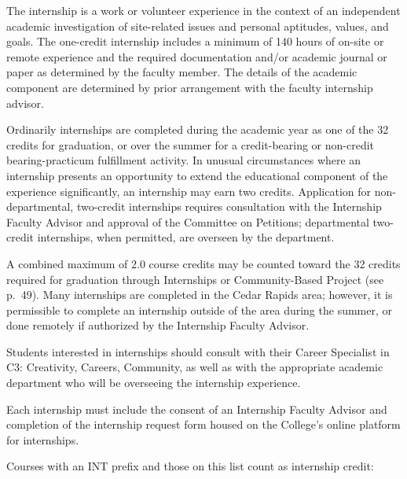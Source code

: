 \documentclass[
  letterpaper,
]{scrbook}
\begin{document}
The internship is a work or volunteer experience in the context of an
independent academic investigation of site-related issues and personal
aptitudes, values, and goals. The one-credit internship includes a
minimum of 140 hours of on-site or remote experience and the required
documentation and/or academic journal or paper as determined by the
faculty member. The details of the academic component are determined by
prior arrangement with the faculty internship advisor.

Ordinarily internships are completed during the academic year as one of
the 32 credits for graduation, or over the summer for a credit-bearing
or non-credit bearing-practicum fulfillment activity. In unusual
circumstances where an internship presents an opportunity to extend the
educational component of the experience significantly, an internship may
earn two credits. Application for non-departmental, two-credit
internships requires consultation with the Internship Faculty Advisor
and approval of the Committee on Petitions; departmental two-credit
internships, when permitted, are overseen by the department.

A combined maximum of 2.0 course credits may be counted toward the 32
credits required for graduation through Internships or Community-Based
Project (see p.~49). Many internships are completed in the Cedar Rapids
area; however, it is permissible to complete an internship outside of
the area during the summer, or done remotely if authorized by the
Internship Faculty Advisor.

Students interested in internships should consult with their Career
Specialist in C3: Creativity, Careers, Community, as well as with the
appropriate academic department who will be overseeing the internship
experience.

Each internship must include the consent of an Internship Faculty
Advisor and completion of the internship request form housed on the
College's online platform for internships.

Courses with an INT prefix and those on this list count as internship
credit:
\end{document}
